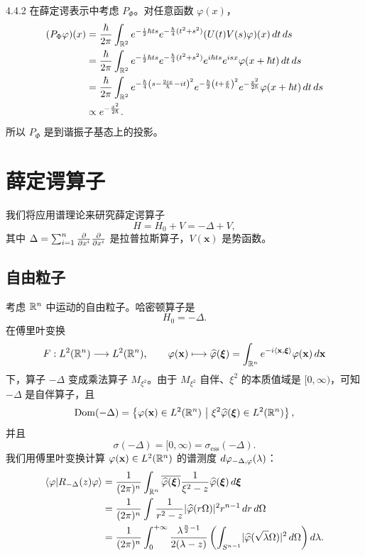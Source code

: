 \begin{example}{4.4.2}
  在薛定谔表示中考虑 $P_\Phi$。对任意函数 $\varphi(x)$，
  \begin{align*}
  (P_\Phi\varphi)(x)
  &=\frac{\hbar}{2\pi}\int_{\mathbb{R}^2}e^{-\frac{i}{2}\hbar ts}e^{-\frac{\hbar}{4}(t^2+s^2)}(U(t)V(s)\varphi)(x)\,d t\,d s\\
  &=\frac{\hbar}{2\pi}\int_{\mathbb{R}^2}e^{-\frac{i}{2}\hbar ts}e^{-\frac{\hbar}{4}(t^2+s^2)}
  e^{i\hbar ts}e^{i sx}\varphi(x+\hbar t)\,d t\,d s\\
  &=\frac{\hbar}{2\pi}\int_{\mathbb{R}^2}e^{-\frac{\hbar}{4}\left(s-\frac{2i x}{\hbar}-i t\right)^2}
  e^{-\frac{\hbar}{2}\left(t+\frac{x}{\hbar}\right)^2}e^{-\frac{x^2}{2\hbar}}\varphi(x+\hbar t)\,d t\,d s\\
  &\propto e^{-\frac{x^2}{2\hbar}}.
  \end{align*}
  所以 $P_\Phi$ 是到谐振子基态上的投影。
\end{example}


\section{薛定谔算子}

我们将应用谱理论来研究薛定谔算子
\[
H=H_0+V=-\Delta+V,
\]
其中 $\Delta=\sum_{i=1}^n\frac{\partial}{\partial x^i}\frac{\partial}{\partial x^i}$ 是拉普拉斯算子，$V(\mathbf{x})$ 是势函数。

\subsection{自由粒子}

考虑 $\mathbb{R}^n$ 中运动的自由粒子。哈密顿算子是
\[
H_0=-\Delta.
\]
在傅里叶变换
\[
F:L^2(\mathbb{R}^n)\longrightarrow L^2(\mathbb{R}^n),\qquad
\varphi(\mathbf{x})\longmapsto\widehat{\varphi}(\boldsymbol{\xi})
=\int_{\mathbb{R}^n}e^{-i\langle\mathbf{x},\boldsymbol{\xi}\rangle}\varphi(\mathbf{x})\,d\mathbf{x}
\]
下，算子 $-\Delta$ 变成乘法算子 $M_{\xi^2}$。由于 $M_{\xi^2}$ 自伴、$\xi^2$ 的本质值域是 $[0,\infty)$，可知 $-\Delta$ 是自伴算子，且
\[
\operatorname{Dom}(-\Delta)=\left\{\varphi(\mathbf{x})\in L^2(\mathbb{R}^n)\ \middle|\ \xi^2\widehat{\varphi}(\boldsymbol{\xi})\in L^2(\mathbb{R}^n)\right\},
\]
并且
\[
\sigma(-\Delta)=[0,\infty)=\sigma_{\mathrm{ess}}(-\Delta).
\]
我们用傅里叶变换计算 $\varphi(\mathbf{x})\in L^2(\mathbb{R}^n)$ 的谱测度 $d\varphi_{-\Delta,\varphi}(\lambda)$：
\begin{align*}
\langle\varphi|R_{-\Delta}(z)\varphi\rangle
&=\frac{1}{(2\pi)^n}\int_{\mathbb{R}^n}\overline{\widehat{\varphi}(\boldsymbol{\xi})}
\frac{1}{\xi^2-z}\widehat{\varphi}(\boldsymbol{\xi})\,d\boldsymbol{\xi}\\
&=\frac{1}{(2\pi)^n}\int\frac{1}{r^2-z}\lvert \widehat{\varphi}(r\Omega)\rvert^2r^{n-1}\,d r\,d\Omega\\
&=\frac{1}{(2\pi)^n}\int_0^{+\infty}\frac{\lambda^{\frac n2-1}}{2(\lambda-z)}
\left(\int_{S^{n-1}}\lvert \widehat{\varphi}(\sqrt{\lambda}\Omega)\rvert^2\,d\Omega\right)d\lambda.
\end{align*}

